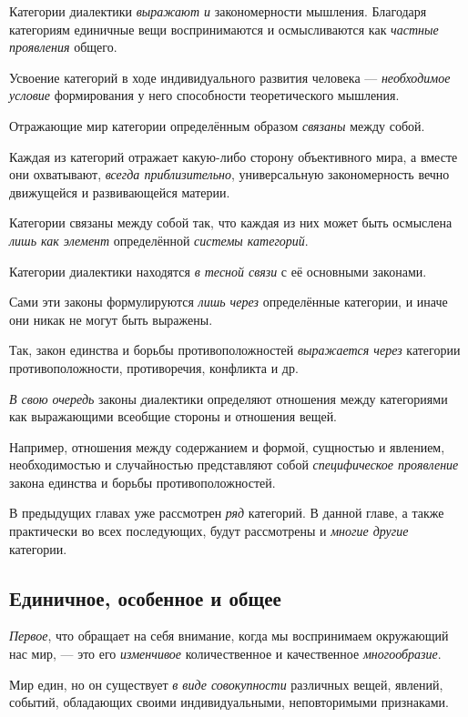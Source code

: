 \documentclass[a4paper,14pt,russian]{extreport}
\begin{document}
Категории диалектики \emph{выражают и} закономерности мышления. Благодаря категориям единичные вещи воспринимаются и осмысливаются как \emph{частные проявления} общего.

Усвоение категорий в ходе индивидуального развития человека --- \emph{необходимое условие} формирования у него способности теоретического мышления.

Отражающие мир категории определённым образом \emph{связаны} между собой.

Каждая из категорий отражает какую-либо сторону объективного мира, а вместе они охватывают, \emph{всегда приблизительно}, универсальную закономерность вечно движущейся и развивающейся материи.

Категории связаны между собой так, что каждая из них может быть осмыслена \emph{лишь как элемент} определённой \emph{системы категорий}.

Категории диалектики находятся \emph{в тесной связи} с её основными законами.

Сами эти законы формулируются \emph{лишь через} определённые категории, и иначе они никак не могут быть выражены.

Так, закон единства и борьбы противоположностей \emph{выражается через} категории противоположности, противоречия, конфликта и др.

\emph{В свою очередь} законы диалектики определяют отношения между категориями как выражающими всеобщие стороны и отношения вещей.

Например, отношения между содержанием и формой, сущностью и явлением, необходимостью и случайностью представляют собой \emph{специфическое проявление} закона единства и борьбы противоположностей.

В предыдущих главах уже рассмотрен \emph{ряд} категорий. В данной главе, а также практически во всех последующих, будут рассмотрены и \emph{многие другие} категории.

\subsection{Единичное, особенное и общее}

\emph{Первое}, что обращает на себя внимание, когда мы воспринимаем окружающий нас мир, --- это его \emph{изменчивое} количественное и качественное \emph{многообразие}.

Мир един, но он существует \emph{в виде совокупности} различных вещей, явлений, событий, обладающих своими индивидуальными, неповторимыми признаками.
\end{document}
